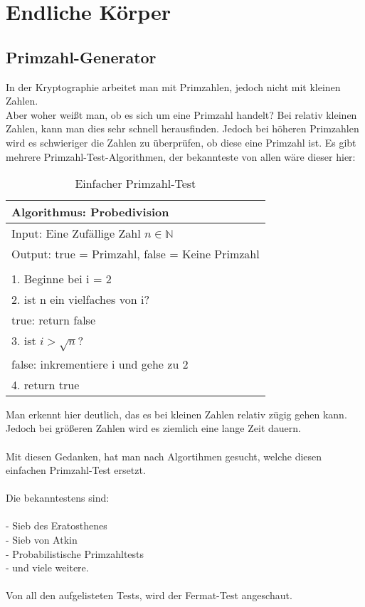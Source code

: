 \chapter{Endliche Körper}

\section{Primzahl-Generator}
In der Kryptographie arbeitet man mit Primzahlen, jedoch nicht mit kleinen Zahlen.\\
Aber woher weißt man, ob es sich um eine Primzahl handelt? Bei relativ kleinen Zahlen, kann man dies sehr schnell herausfinden.
Jedoch bei höheren Primzahlen wird es schwieriger die Zahlen zu überprüfen, ob diese eine Primzahl ist.
Es gibt mehrere Primzahl-Test-Algorithmen, der bekannteste von allen wäre dieser hier:

\begin{table}[!ht]
    \centering
        \begin{tabular}{l}
            \toprule
            \textbf{Algorithmus: Probedivision}\\
            \midrule
            Input: Eine Zufällige Zahl $n \in \mathbb{N} $\\
            Output: true = Primzahl, false = Keine Primzahl  \\
                                                       \\
                1. Beginne bei i = 2\\
                2. ist n ein vielfaches von i?\\
                    true: return false\\
                3. ist $ i > \sqrt{n}$?\\
                    false: inkrementiere i und gehe zu 2\\
                4. return true\\
           \bottomrule
        \end{tabular}
        \caption{Einfacher Primzahl-Test}
        \label{tab3}
    \end{table}

Man erkennt hier deutlich, das es bei kleinen Zahlen relativ zügig gehen kann.\\
Jedoch bei größeren Zahlen wird es ziemlich eine lange Zeit dauern. \\
\\
Mit diesen Gedanken, hat man nach Algortihmen gesucht, welche diesen einfachen Primzahl-Test ersetzt.\\
\\Die bekanntestens sind:\\
\\
- Sieb des Eratosthenes\\
- Sieb von Atkin\\
- Probabilistische Primzahltests\\
- und viele weitere.\\
\\
Von all den aufgelisteten Tests, wird der Fermat-Test angeschaut.\\
\newpage
